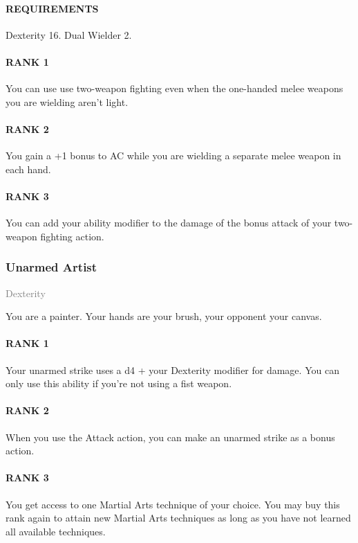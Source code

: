 \paragraph{REQUIREMENTS} Dexterity 16. Dual Wielder 2.
\paragraph{RANK 1} You can use use two-weapon fighting even when the one-handed melee weapons you are wielding aren't light.
\paragraph{RANK 2} You gain a +1 bonus to AC while you are wielding a separate melee weapon in each hand.
\paragraph{RANK 3} You can add your ability modifier to the damage of the bonus attack of your two-weapon fighting action.

\subsubsection{Unarmed Artist} \label{feat::unarmedartist}
\small{\textcolor{gray}{Dexterity}}

\normalsize
You are a painter.
Your hands are your brush, your opponent your canvas.
\paragraph{RANK 1} Your unarmed strike uses a d4 + your Dexterity modifier for damage.
You can only use this ability if you're not using a fist weapon.
\paragraph{RANK 2} When you use the Attack action, you can make an unarmed strike as a bonus action.
\paragraph{RANK 3} You get access to one Martial Arts technique of your choice.
You may buy this rank again to attain new Martial Arts techniques as long as you have not learned all available techniques.

